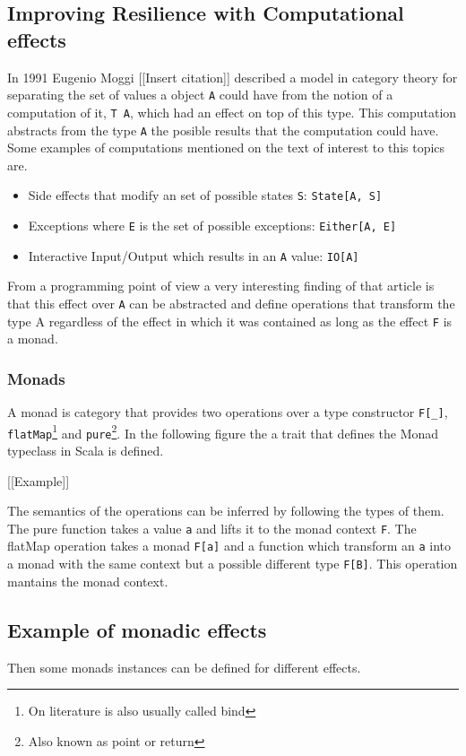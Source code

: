 \documentclass[../main.tex]{subfiles}
\begin{document}
\subsection{Improving Resilience with Computational effects}
In 1991 Eugenio Moggi [[Insert citation]] described a model in category theory
for separating the set of values a object \texttt{A} could have from the notion
of a computation of it, \texttt{T A}, which had an effect on top of this type.
This computation abstracts from the type \texttt{A} the posible results that the
computation could have. Some examples of computations mentioned on the text of
interest to this topics are.

\begin{itemize}
\item Side effects that modify an set of possible states \texttt{S}: \texttt{State[A, S]}
\item Exceptions where \texttt{E} is the set of possible exceptions: \texttt{Either[A, E]}
\item Interactive Input/Output which results in an \texttt{A} value: \texttt{IO[A]}
\end{itemize}

From a programming point of view a very interesting finding of that article is
that this effect over \texttt{A} can be abstracted and define operations that transform
the type A regardless of the effect in which it was contained as long as the
effect \texttt{F} is a monad. %

\subsubsection{Monads}
A monad is category that provides two operations over a type constructor
\texttt{F[\_]}, \texttt{flatMap}\footnote{On literature is also usually called bind} and
\texttt{pure}\footnote{Also known as point or return}. In the following figure the a
trait that defines the Monad typeclass in Scala is defined.

[[Example]]

The semantics of the operations can be inferred by following the types of them.
The pure function takes a value \texttt{a} and lifts it to the monad context
\texttt{F}. The flatMap operation takes a monad \texttt{F[a]} and a function
which transform an \texttt{a} into a monad with the same context but a possible
different type \texttt{F[B]}. This operation mantains the monad context.

\subsection{Example of monadic effects}
Then some monads instances can be defined for different effects.
\end{document}

